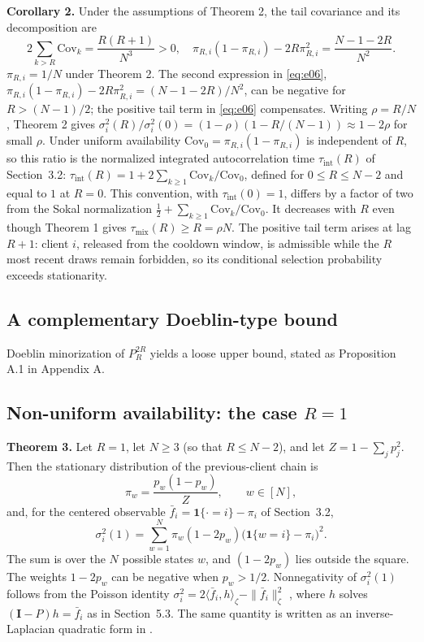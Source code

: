\documentclass[twoside,11pt]{article}
\begin{document}
\textbf{Corollary 2.} Under the assumptions of Theorem 2, the tail covariance and its decomposition are
\begin{equation}\label{eq:e06}
2\sum_{k>R}\mathrm{Cov}_k=\dfrac{R(R+1)}{N^{3}}>0,\quad \pi_{R,i}(1-\pi_{R,i})-2R\pi_{R,i}^{2}=\dfrac{N-1-2R}{N^{2}}.
\end{equation}
$\pi_{R,i}=1/N$ under Theorem 2. The second expression in \eqref{eq:e06}, $\pi_{R,i}(1-\pi_{R,i})-2R\pi_{R,i}^{2}=(N-1-2R)/N^{2}$, can be negative for $R>(N-1)/2$; the positive tail term in \eqref{eq:e06} compensates. Writing $\rho=R/N$, Theorem 2 gives $\sigma_i^{2}(R)/\sigma_i^{2}(0)=(1-\rho)(1-R/(N-1))\approx1-2\rho$ for small $\rho$. Under uniform availability $\mathrm{Cov}_0=\pi_{R,i}(1-\pi_{R,i})$ is independent of $R$, so this ratio is the normalized integrated autocorrelation time $\tau_{\mathrm{int}}(R)$ of Section~3.2: $\tau_{\mathrm{int}}(R)=1+2\sum_{k\geq1}\mathrm{Cov}_k/\mathrm{Cov}_0$, defined for $0\leq R\leq N-2$ and equal to $1$ at $R=0$. This convention, with $\tau_{\mathrm{int}}(0)=1$, differs by a factor of two from the Sokal normalization $\frac{1}{2}+\sum_{k\geq1}\mathrm{Cov}_k/\mathrm{Cov}_0$. It decreases with $R$ even though Theorem 1 gives $\tau_{\mathrm{mix}}(R)\geq R=\rho N$. The positive tail term arises at lag $R+1$: client $i$, released from the cooldown window, is admissible while the $R$ most recent draws remain forbidden, so its conditional selection probability exceeds stationarity.

\subsection{A complementary Doeblin-type bound}
Doeblin minorization of $P_R^{2R}$ yields a loose upper bound, stated as Proposition A.1 in Appendix A.

\subsection{\texorpdfstring{Non-uniform availability: the case $R=1$}{Non-uniform availability: the case R=1}}
\textbf{Theorem 3.} Let $R=1$, let $N\geq3$ (so that $R\leq N-2$), and let $Z=1-\sum_{j}p_j^{2}$. Then the stationary distribution of the previous-client chain is
\begin{equation}\label{eq:e07}
\pi_w=\dfrac{p_w(1-p_w)}{Z},\qquad w\in[N],
\end{equation}
and, for the centered observable $\bar f_i=\mathbf{1}\{\cdot=i\}-\pi_i$ of Section~3.2,
\begin{equation}\label{eq:e08}
\sigma_i^{2}(1)=\sum_{w=1}^{N}\pi_w(1-2p_w)\big(\mathbf{1}\{w=i\}-\pi_i\big)^{2}.
\end{equation}
The sum is over the $N$ possible states $w$, and $(1-2p_w)$ lies outside the square. The weights $1-2p_w$ can be negative when $p_w>1/2$. Nonnegativity of $\sigma_i^{2}(1)$ follows from the Poisson identity $\sigma_i^{2}=2\langle\bar f_i,h\rangle_{\zeta}-\|\bar f_i\|_{\zeta}^{2}$ \citep{ref4}, where $h$ solves $(\mathbf{I}-P)h=\bar f_i$ as in Section~5.3. The same quantity is written as an inverse-Laplacian quadratic form in \citep{ref20,ref21}.
\end{document}
